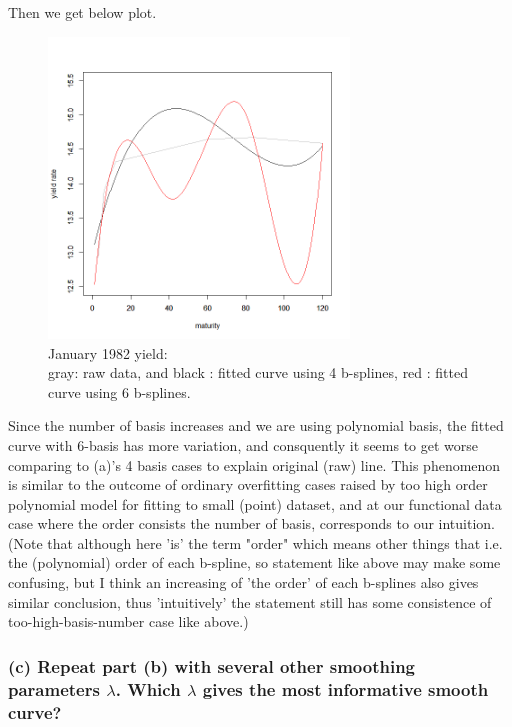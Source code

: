 \documentclass{article}
\begin{document}
Then we get below plot.

\begin{figure}[hh]
    \centering
    \includegraphics[height=8cm]{1982Jyield_raw_bspline4_bspline6.png}
    \caption{January 1982 yield: \\ gray: raw data, and black : fitted curve using 4 b-splines, red : fitted curve using 6 b-splines.}
\end{figure}

Since the number of basis increases and we are using polynomial basis, the fitted curve with 6-basis has more variation,
and consquently it seems to get worse comparing to (a)'s 4 basis cases to explain original (raw) line. 
This phenomenon is similar to the outcome of ordinary overfitting cases raised by too high order polynomial model for fitting to small (point) dataset,
and at our functional data case where the order consists the number of basis, corresponds to our intuition.
(Note that although here 'is' the term "order" which means other things that i.e. the (polynomial) order of each b-spline,
so statement like above may make some confusing, but I think an increasing of 'the order' of each b-splines also gives similar conclusion,
thus 'intuitively' the statement still has some consistence of too-high-basis-number case like above.)

\newpage
\subsubsection*{(c) Repeat part (b) with several other smoothing parameters $\lambda$. Which $\lambda$ gives the most informative smooth curve?}
\end{document}
